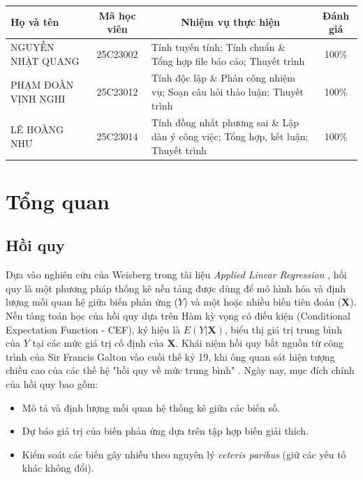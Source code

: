 \documentclass[12pt, a4paper]{article}
\begin{document}
	\begin{table}[h]
		\centering
		\small
		\renewcommand{\arraystretch}{1.4}
		\begin{tabularx}{\textwidth}{|l|c|X|c|}
			\hline
			\textbf{Họ và tên} & \textbf{Mã học viên} & \multicolumn{1}{c|}{\textbf{Nhiệm vụ thực hiện}} & \textbf{Đánh giá} \\
			\hline
			NGUYỄN NHẬT QUANG & 25C23002 & Tính tuyến tính; Tính chuẩn \& Tổng hợp file báo cáo; Thuyết trình & 100\% \\ \hline
			PHẠM ĐOÀN VỊNH NGHI & 25C23012 & Tính độc lập \& Phân công nhiệm vụ; Soạn câu hỏi thảo luận; Thuyết trình & 100\% \\ \hline
			LÊ HOÀNG NHƯ & 25C23014 & Tính đồng nhất phương sai \& Lập dàn ý công việc; Tổng hợp, kết luận; Thuyết trình & 100\% \\
			\hline
		\end{tabularx}
	\end{table}
	
	\newpage
	\tableofcontents
	\newpage
	
	\section{Tổng quan}
	
	\subsection{Hồi quy}
	Dựa vào nghiên cứu của Weisberg trong tài liệu \textit{Applied Linear Regression} \cite{weisberg2014}, hồi quy là một phương pháp thống kê nền tảng được dùng để mô hình hóa và định lượng mối quan hệ giữa biến phản ứng ($Y$) và một hoặc nhiều biến tiên đoán ($\mathbf{X}$). Nền tảng toán học của hồi quy dựa trên Hàm kỳ vọng có điều kiện (Conditional Expectation Function - CEF), ký hiệu là $E(Y|\mathbf{X})$, biểu thị giá trị trung bình của $Y$ tại các mức giá trị cố định của $\mathbf{X}$. Khái niệm hồi quy bắt nguồn từ công trình của Sir Francis Galton vào cuối thế kỷ 19, khi ông quan sát hiện tượng chiều cao của các thế hệ "hồi quy về mức trung bình" \cite{galton1886}. Ngày nay, mục đích chính của hồi quy bao gồm:
	\begin{itemize}
		\item Mô tả và định lượng mối quan hệ thống kê giữa các biến số.
		\item Dự báo giá trị của biến phản ứng dựa trên tập hợp biến giải thích.
		\item Kiểm soát các biến gây nhiễu theo nguyên lý \textit{ceteris paribus} (giữ các yếu tố khác không đổi).
	\end{itemize}
	
\end{document}
